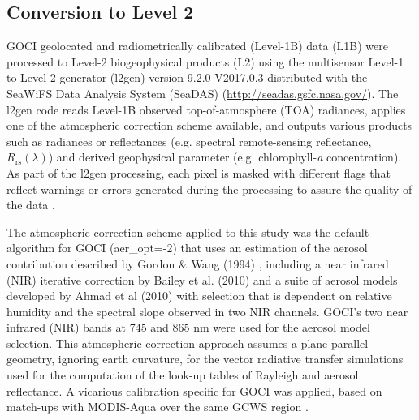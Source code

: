 \documentclass[remotesensing,article,submit,moreauthors,pdftex,10pt,a4paper]{Definitions/mdpi}
\begin{document}
\subsection{Conversion to Level 2}
GOCI geolocated and radiometrically calibrated (Level-1B) data (L1B) were processed to Level-2 biogeophysical products (L2) using the multisensor Level-1 to Level-2 generator (l2gen) version 9.2.0-V2017.0.3 distributed with the SeaWiFS Data Analysis System (SeaDAS) (\url{http://seadas.gsfc.nasa.gov/}). The l2gen code reads Level-1B observed top-of-atmosphere (TOA) radiances, applies one of the atmospheric correction scheme available, and outputs various products such as radiances or reflectances (e.g. spectral remote-sensing reflectance, $R_\text{rs}(\lambda)$) and derived geophysical parameter (e.g. chlorophyll-{\it a} concentration). As part of the l2gen processing, each pixel is masked with different flags that reflect warnings or errors generated during the processing to assure the quality of the data \cite{Bailey2006}. 


The atmospheric correction scheme applied to this study was the default algorithm for GOCI (aer\_opt=-2) that uses an estimation of the aerosol contribution described by Gordon \& Wang (1994) \cite{Gordon1994}, including a near infrared (NIR) iterative correction by Bailey et al. (2010) \cite{Bailey2010} and a suite of aerosol models developed by Ahmad et al (2010) \cite{Ahmad2010} with selection that is dependent on relative humidity and the spectral slope observed in two NIR channels. GOCI's two near infrared (NIR) bands at 745 and 865 nm were used for the aerosol model selection. This atmospheric correction approach assumes a plane-parallel geometry, ignoring earth curvature, for the vector radiative transfer simulations used for the computation of the look-up tables of Rayleigh and aerosol reflectance. A vicarious calibration specific for GOCI was applied, based on match-ups with MODIS-Aqua over the same GCWS region \cite{Concha_2018a}. 
\end{document}

